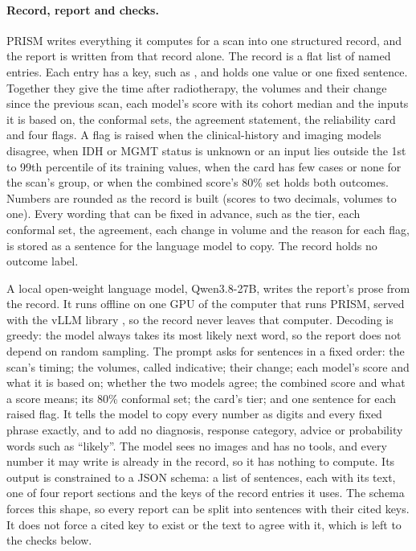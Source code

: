 \paragraph*{Record, report and checks.} PRISM writes everything it computes for a scan into one structured record,
and the report is written from that record alone. The record is a flat list of named entries. Each entry has a key,
such as , and holds one value or one fixed sentence. Together they give the time after
radiotherapy, the volumes and their change since the previous scan, each model's score with its cohort median and the
inputs it is based on, the conformal sets, the agreement statement, the reliability card and four flags. A flag is
raised when the clinical-history and imaging models disagree, when IDH or MGMT status is unknown or an input lies
outside the 1st to 99th percentile of its training values, when the card has few cases or none for the scan's group, or when the combined score's 80\% set
holds both outcomes. Numbers are rounded as the record is built (scores to two decimals, volumes to one). Every wording
that can be fixed in advance, such as the tier, each conformal set, the agreement, each change in volume and the
reason for each flag, is stored as a sentence for the language model to copy. The record holds no outcome label.

A local open-weight language model, Qwen3.8-27B, writes the report's prose from the record. It runs offline on one GPU
of the computer that runs PRISM, served with the vLLM library \citep{kwon2023}, so the record never leaves that
computer. Decoding is greedy: the model always takes its most likely next word, so the report does not depend on
random sampling. The prompt asks for sentences in a fixed order: the scan's timing; the volumes, called indicative;
their change; each model's score and what it is based on; whether the two models agree; the combined score and what a
score means; its 80\% conformal set; the card's tier; and one sentence for each raised flag. It tells the model to copy
every number as digits and every fixed phrase exactly, and to add no diagnosis, response category, advice or
probability words such as ``likely''. The model sees no images and has no tools, and every number it may write is
already in the record, so it has nothing to compute. Its output is constrained to a JSON schema: a list of sentences,
each with its text, one of four report sections and the keys of the record entries it uses. The schema forces this
shape, so every report can be split into sentences with their cited keys. It does not force a cited key to exist or
the text to agree with it, which is left to the checks below.

